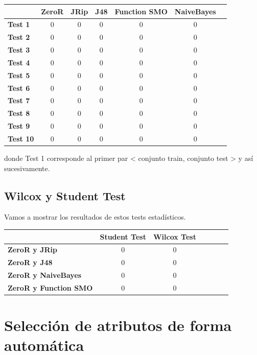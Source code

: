 \documentclass[11pt,a4paper,twoside]{tesis}
\begin{document}
\begin{table}[h]
\centering
\begin{tabular}{|l|c|c|c|c|c|c|}
\hline
\textbf{}  & \textbf{ZeroR} & \textbf{JRip} & \textbf{J48} & \textbf{Function SMO} & \textbf{NaiveBayes} \\ \hline
\textbf{Test 1}  & 0 & 0 & 0 & 0 & 0\\ \hline
\textbf{Test 2}  & 0 & 0 & 0 & 0 & 0\\ \hline
\textbf{Test 3}  & 0 & 0 & 0 & 0 & 0\\ \hline
\textbf{Test 4}  & 0 & 0 & 0 & 0 & 0\\ \hline
\textbf{Test 5}  & 0 & 0 & 0 & 0 & 0\\ \hline
\textbf{Test 6}  & 0 & 0 & 0 & 0 & 0\\ \hline
\textbf{Test 7}  & 0 & 0 & 0 & 0 & 0\\ \hline
\textbf{Test 8}  & 0 & 0 & 0 & 0 & 0\\ \hline
\textbf{Test 9}  & 0 & 0 & 0 & 0 & 0\\ \hline
\textbf{Test 10} & 0 & 0 & 0 & 0 & 0\\ \hline
\end{tabular}
\end{table}

donde Test 1 corresponde al primer par < conjunto train, conjunto test > y así sucesivamente.

\subsection{Wilcox y Student Test}

Vamos a mostrar los resultados de estos tests estadísticos.

\begin{table}[h]
\centering
\begin{tabular}{|l|c|c|c|c|c|c|}
\hline
\textbf{}  & \textbf{Student Test} & \textbf{Wilcox Test} \\ \hline
\textbf{ZeroR y JRip}  & 0 & 0 \\ \hline
\textbf{ZeroR y J48}  & 0 & 0 \\ \hline
\textbf{ZeroR y NaiveBayes}  & 0 & 0 \\ \hline
\textbf{ZeroR y Function SMO}  & 0 & 0 \\ \hline
\end{tabular}
\end{table}

\section{Selección de atributos de forma automática}
\end{document}
